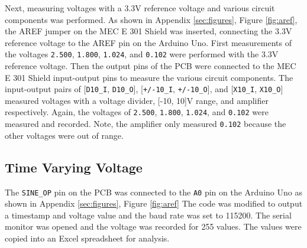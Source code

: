 Next, measuring voltages with a 3.3V reference voltage and various circuit components was performed. As shown in Appendix \ref{sec:figures}, Figure \ref{fig:aref},
the AREF jumper on the MEC E 301 Shield was inserted, connecting the 3.3V reference voltage to the AREF pin on the Arduino Uno. First measurements of the voltages \texttt{2.500}, 
\texttt{1.800}, \texttt{1.024}, and \texttt{0.102} were performed with the 3.3V reference voltage. Then the output pins of the PCB were connected to the MEC E 301 Shield input-output 
pins to measure the various circuit components. The input-output pairs of [\texttt{D10\_I}, \texttt{D10\_O}], [\texttt{+/-10\_I}, \texttt{+/-10\_O}], and [\texttt{X10\_I}, 
\texttt{X10\_O}] measured voltages with a voltage divider, [-10, 10]V range, and amplifier respectively. Again, the voltages of \texttt{2.500}, \texttt{1.800}, \texttt{1.024}, 
and \texttt{0.102} were measured and recorded. Note, the amplifier only measured \texttt{0.102} because the other voltages were out of range.




\subsection{Time Varying Voltage}
\noindent The \texttt{SINE\_OP} pin on the PCB was connected to the \texttt{A0} pin on the Arduino Uno as shown in Appendix \ref{sec:figures}, Figure \ref{fig:aref}
The code was modified to output a timestamp and voltage value and the baud rate was set to 115200. The serial monitor was opened and the voltage was recorded for 255 values. The values were 
copied into an Excel spreadsheet for analysis.

